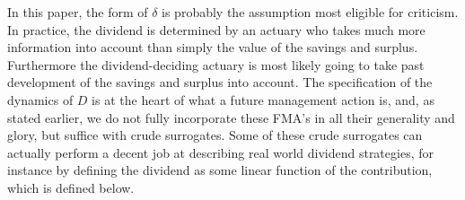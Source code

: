 \documentclass[12pt]{article}
\theoremstyle{my_thm}
\begin{document}
In this paper, the form of $\delta$ is probably the assumption most eligible for criticism. In practice, the dividend is determined by an actuary who takes much more information into account than simply the value of the savings and surplus. Furthermore the dividend-deciding actuary is most likely going to take past development of the savings and surplus into account. The specification of the dynamics of $D$ is at the heart of what a future management action is, and, as stated earlier, we do not fully incorporate these FMA's in all their generality and glory, but suffice with crude surrogates. Some of these crude surrogates can actually perform a decent job at describing real world dividend strategies, for instance by defining the dividend as some linear function of the contribution, which is defined below.









\end{document}
